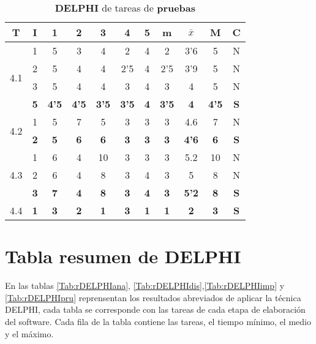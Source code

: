 \documentclass[11pt,a4paper,spanish,twoside]{report}
\begin{document}
\begin{table}[!h]
\centering
  \begin{tabular}{|c|c||c|c|c|c|c||c|c|c||c|}
    \hline
    \textbf{T} & \textbf{I} & \textbf{1} &
    \textbf{2} & \textbf{3} & \textbf{4} & \textbf{5} & \textbf{m}
    &\textbf{$\bar{x}$} &\textbf{M} & \textbf{C}\\    
    \hline \hline

    \multirow{4}{*}{4.1}
    & 1 & 5 & 3 & 4 & 2   & 4 & 2   & 3'6 & 5 & N \\
    & 2 & 5 & 4 & 4 & 2'5 & 4 & 2'5 & 3'9 & 5 & N \\
    & 3 & 5 & 4 & 4 & 3   & 4 & 3   & 4   & 5 & N \\
    & \textbf{5} & \textbf{4'5} & \textbf{4'5} & \textbf{3'5} & \textbf{3'5}
    & \textbf{4} & \textbf{3'5} & \textbf{4} & \textbf{4'5} & \textbf{S} \\
    \hline
    
    \multirow{2}{*}{4.2} & 1 & 5 & 7 & 5 & 3 & 3 & 3 & 4.6 & 7 & N \\
    & \textbf{2} & \textbf{5} & \textbf{6} & \textbf{6} & \textbf{3} &
    \textbf{3} & \textbf{3} & \textbf{4'6} & \textbf{6} & \textbf{S} \\
    \hline

    \multirow{3}{*}{4.3}
    & 1 & 6 & 4 & 10 & 3 & 3 & 3 & 5.2 & 10 & N \\
    & 2 & 6 & 4 & 8  & 3 & 4 & 3 & 5   & 8  & N \\
    & \textbf{3} & \textbf{7} & \textbf{4} & \textbf{8} & \textbf{3} &
    \textbf{4} & \textbf{3} & \textbf{5'2} & \textbf{8} & \textbf{S} \\
    \hline

    4.4 & \textbf{1} & \textbf{3} & \textbf{2} & \textbf{1} &
    \textbf{3} & \textbf{1} & \textbf{1} & \textbf{2} & \textbf{3} &
    \textbf{S} \\
    \hline
  \end{tabular}
  \caption{\textbf{DELPHI} de tareas de \textbf{pruebas}}
  \label{Tab:DELPHIpru}
\end{table} 

\section{Tabla resumen de DELPHI}
En las tablas \ref{Tab:rDELPHIana}, \ref{Tab:rDELPHIdis},\ref{Tab:rDELPHIimp} y
\ref{Tab:rDELPHIpru} reprensentan los resultados abreviados de aplicar la
técnica DELPHI, cada tabla se corresponde con las tareas de cada etapa de
elaboración del software. Cada fila de la tabla contiene las tareas, el
tiempo mínimo, el medio y el máximo.
\end{document}
